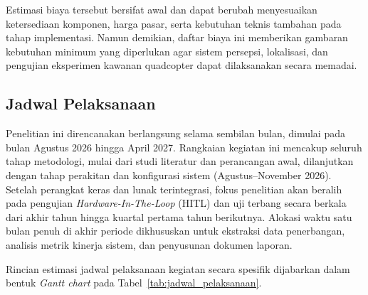 \documentclass[12pt,a4paper]{report}
\numberwithin{equation}{chapter}
\begin{document}
Estimasi biaya tersebut bersifat awal dan dapat berubah menyesuaikan ketersediaan komponen, harga pasar, serta kebutuhan teknis tambahan pada tahap implementasi. Namun demikian, daftar biaya ini memberikan gambaran kebutuhan minimum yang diperlukan agar sistem persepsi, lokalisasi, dan pengujian eksperimen kawanan quadcopter dapat dilaksanakan secara memadai.

\subsection{Jadwal Pelaksanaan}
Penelitian ini direncanakan berlangsung selama sembilan bulan, dimulai pada bulan Agustus 2026 hingga April 2027. Rangkaian kegiatan ini mencakup seluruh tahap metodologi, mulai dari studi literatur dan perancangan awal, dilanjutkan dengan tahap perakitan dan konfigurasi sistem (Agustus--November 2026). Setelah perangkat keras dan lunak terintegrasi, fokus penelitian akan beralih pada pengujian \textit{Hardware-In-The-Loop} (HITL) dan uji terbang secara berkala dari akhir tahun hingga kuartal pertama tahun berikutnya. Alokasi waktu satu bulan penuh di akhir periode dikhususkan untuk ekstraksi data penerbangan, analisis metrik kinerja sistem, dan penyusunan dokumen laporan.

Rincian estimasi jadwal pelaksanaan kegiatan secara spesifik dijabarkan dalam bentuk \textit{Gantt chart} pada Tabel~\ref{tab:jadwal_pelaksanaan}.
\end{document}
